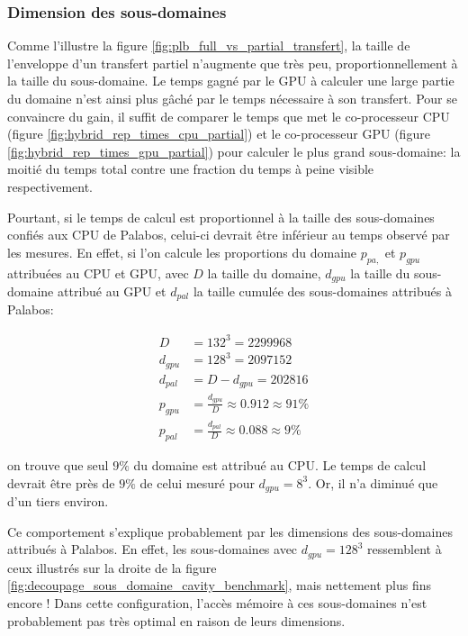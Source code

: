 \subsubsection{Dimension des sous-domaines} \label{title-mesure_hybride_dim_sous_dom}
Comme l'illustre la figure \ref{fig:plb_full_vs_partial_transfert}, la taille de l'enveloppe d'un transfert partiel n'augmente que très peu, proportionnellement à la taille du sous-domaine. Le temps gagné par le \acs{GPU} à calculer une large partie du domaine n'est ainsi plus gâché par le temps nécessaire à son transfert. Pour se convaincre du gain, il suffit de comparer le temps que met le co-processeur \acs{CPU} (figure \ref{fig:hybrid_rep_times_cpu_partial}) et le co-processeur \acs{GPU} (figure \ref{fig:hybrid_rep_times_gpu_partial}) pour calculer le plus grand sous-domaine: la moitié du temps total contre une fraction du temps à peine visible respectivement.

Pourtant, si le temps de calcul est proportionnel à la taille des sous-domaines confiés aux \acs{CPU} de Palabos, celui-ci devrait être inférieur au temps observé par les mesures. En effet, si l’on calcule les proportions du domaine $p_{pa,}$ et $p_{gpu}$ attribuées au \acs{CPU} et \acs{GPU}, avec $D$ la taille du  domaine, $d_{gpu}$ la taille du sous-domaine attribué au \acs{GPU} et $d_{pal}$ la taille cumulée des sous-domaines attribués à Palabos:

\begin{align}
D &= 132^3 = 2299968\\
d_{gpu} &=128^3 = 2097152\\
d_{pal} &= D - d_{gpu} = 202816\\
p_{gpu} &= \frac{d_{gpu}}{D} \approx 0.912 \approx 91\% \\
p_{pal} &= \frac{d_{pal}}{D} \approx 0.088  \approx 9 \%
\end{align}

on trouve que seul $9\%$ du domaine est attribué au \acs{CPU}. Le temps de calcul devrait être près de $9\%$ de celui mesuré pour $d_{gpu}=8^3$. Or, il n'a diminué que d'un tiers environ. 

Ce comportement s'explique probablement par les dimensions des sous-domaines attribués à Palabos. En effet, les sous-domaines avec $d_{gpu}=128^3$ ressemblent à ceux illustrés sur la droite de la figure \ref{fig:decoupage_sous_domaine_cavity_benchmark}, mais nettement plus fins encore ! Dans cette configuration, l'accès mémoire à ces sous-domaines n'est probablement pas très optimal en raison de leurs dimensions. 

